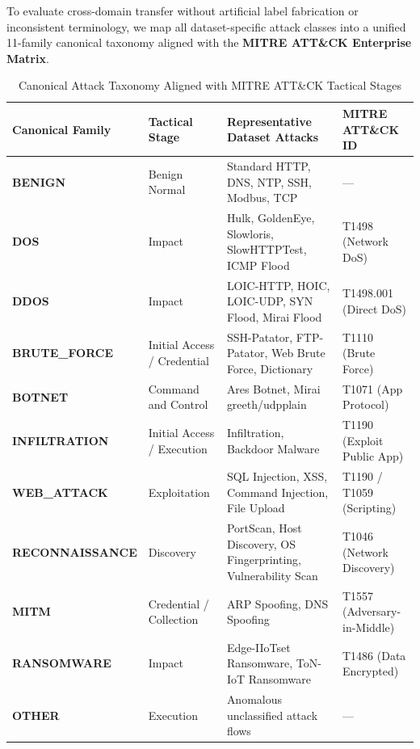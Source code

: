 \documentclass[11pt,a4paper]{article}
\begin{document}
To evaluate cross-domain transfer without artificial label fabrication or inconsistent terminology, we map all dataset-specific attack classes into a unified 11-family canonical taxonomy aligned with the \textbf{MITRE ATT\&CK Enterprise Matrix}.

\begin{table}[ht]
\centering
\caption{Canonical Attack Taxonomy Aligned with MITRE ATT\&CK Tactical Stages}
\label{tab:mitre_mapping}
\small
\begin{tabularx}{\textwidth}{@{} l >{\raggedright\arraybackslash}p{3.0cm} >{\raggedright\arraybackslash}X >{\raggedright\arraybackslash}p{3.8cm} @{}}
\toprule
\textbf{Canonical Family} & \textbf{Tactical Stage} & \textbf{Representative Dataset Attacks} & \textbf{MITRE ATT\&CK ID} \\
\midrule
\textbf{BENIGN} & Benign Normal & Standard HTTP, DNS, NTP, SSH, Modbus, TCP & --- \\
\textbf{DOS} & Impact & Hulk, GoldenEye, Slowloris, SlowHTTPTest, ICMP Flood & T1498 (Network DoS) \\
\textbf{DDOS} & Impact & LOIC-HTTP, HOIC, LOIC-UDP, SYN Flood, Mirai Flood & T1498.001 (Direct DoS) \\
\textbf{BRUTE\_FORCE} & Initial Access / Credential & SSH-Patator, FTP-Patator, Web Brute Force, Dictionary & T1110 (Brute Force) \\
\textbf{BOTNET} & Command and Control & Ares Botnet, Mirai greeth/udpplain & T1071 (App Protocol) \\
\textbf{INFILTRATION} & Initial Access / Execution & Infiltration, Backdoor Malware & T1190 (Exploit Public App) \\
\textbf{WEB\_ATTACK} & Exploitation & SQL Injection, XSS, Command Injection, File Upload & T1190 / T1059 (Scripting) \\
\textbf{RECONNAISSANCE} & Discovery & PortScan, Host Discovery, OS Fingerprinting, Vulnerability Scan & T1046 (Network Discovery) \\
\textbf{MITM} & Credential / Collection & ARP Spoofing, DNS Spoofing & T1557 (Adversary-in-Middle) \\
\textbf{RANSOMWARE} & Impact & Edge-IIoTset Ransomware, ToN-IoT Ransomware & T1486 (Data Encrypted) \\
\textbf{OTHER} & Execution & Anomalous unclassified attack flows & --- \\
\bottomrule
\end{tabularx}
\end{table}
\end{document}
